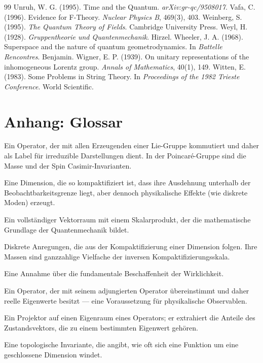 \documentclass[11pt,a4paper]{article}
\begin{document}
\begin{thebibliography}{99}
Unruh, W. G. (1995). Time and the Quantum. \emph{arXiv:gr-qc/9508017}.
Vafa, C. (1996). Evidence for F-Theory. \emph{Nuclear Physics B}, 469(3), 403.
Weinberg, S. (1995). \emph{The Quantum Theory of Fields}. Cambridge University Press.
Weyl, H. (1928). \emph{Gruppentheorie und Quantenmechanik}. Hirzel.
Wheeler, J. A. (1968). Superspace and the nature of quantum geometrodynamics. In \emph{Battelle Rencontres}. Benjamin.
Wigner, E. P. (1939). On unitary representations of the inhomogeneous Lorentz group. \emph{Annals of Mathematics}, 40(1), 149.
Witten, E. (1983). Some Problems in String Theory. In \emph{Proceedings of the 1982 Trieste Conference}. World Scientific.
\end{thebibliography}
\endgroup

\clearpage
{}
{}
\section*{Anhang: Glossar}

\begin{description}[leftmargin=0em,style=nextline,itemsep=0.4em]
  \item[Casimir-Invariante] Ein Operator, der mit allen Erzeugenden einer Lie-Gruppe kommutiert und daher als Label für irreduzible Darstellungen dient. In der Poincaré-Gruppe sind die Masse und der Spin Casimir-Invarianten.
  \item[Eingerollte Dimension] Eine Dimension, die so kompaktifiziert ist, dass ihre Ausdehnung unterhalb der Beobachtbarkeitsgrenze liegt, aber dennoch physikalische Effekte (wie diskrete Moden) erzeugt.
  \item[Hilbertraum] Ein vollständiger Vektorraum mit einem Skalarprodukt, der die mathematische Grundlage der Quantenmechanik bildet.
  \item[Kaluza-Klein-Moden] Diskrete Anregungen, die aus der Kompaktifizierung einer Dimension folgen. Ihre Massen sind ganzzahlige Vielfache der inversen Kompaktifizierungsskala.
  \item[Ontologische Festlegung] Eine Annahme über die fundamentale Beschaffenheit der Wirklichkeit.
  \item[Selbstadjungierter Operator] Ein Operator, der mit seinem adjungierten Operator übereinstimmt und daher reelle Eigenwerte besitzt --- eine Voraussetzung für physikalische Observablen.
  \item[Spektralprojektor] Ein Projektor auf einen Eigenraum eines Operators; er extrahiert die Anteile des Zustandsvektors, die zu einem bestimmten Eigenwert gehören.
  \item[Windungszahl] Eine topologische Invariante, die angibt, wie oft sich eine Funktion um eine geschlossene Dimension windet.
\end{description}
\end{document}
